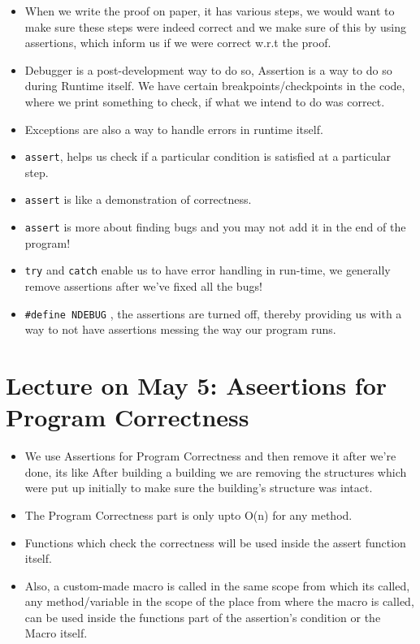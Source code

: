 \documentclass{article}
\begin{document}
\begin{itemize}
  \item When we write the proof on paper, it has various steps, we would want to make sure these steps were indeed correct and we make sure of this by using assertions, which inform us if we were correct w.r.t the proof.
  \item Debugger is a post-development way to do so, Assertion is a way to do so during Runtime itself. We have certain breakpoints/checkpoints in the code, where we print something to check, if what we intend to do was correct.
  \item Exceptions are also a way to handle errors in runtime itself.
  \item \verb|assert|, helps us check if a particular condition is satisfied at a particular step.
  \item \verb|assert| is like a demonstration of correctness.
  \item \verb|assert| is more about finding bugs and you may not add it in the end of the program!
  \item \verb|try| and \verb|catch| enable us to have error handling in run-time, we generally remove assertions after we've fixed all the bugs!
  \item \verb|#define NDEBUG| , the assertions are turned off, thereby providing us with a way to not have assertions messing the way our program runs.
\end{itemize}

\section{Lecture on May 5: Aseertions for Program Correctness}

\begin{itemize}
  \item We use Assertions for Program Correctness and then remove it after we're done, its like After building a building we are removing the structures which were put up initially to make sure the building's structure was intact.
  \item The Program Correctness part is only upto O(n) for any method.
  \item Functions which check the correctness will be used inside the assert function itself.
  \item Also, a custom-made macro is called in the same scope from which its called, any method/variable in the scope of the place from where the macro is called, can be used inside the functions part of the assertion's condition or the Macro itself.
\end{itemize}
\end{document}
